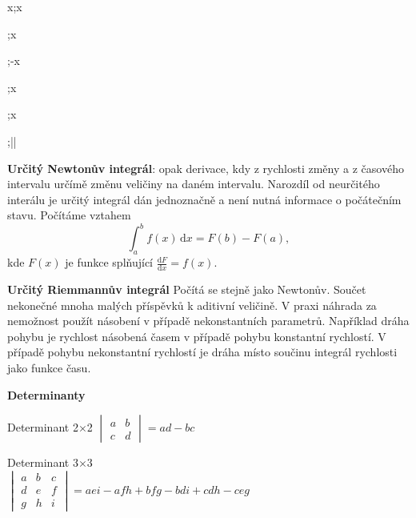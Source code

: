 \documentclass{article}
\def\tg{\mathop{\mathrm{tg}}}
\def\arctg{\mathop{\mathrm{arctg}}}
\def\cotg{\mathop{\mathrm{cotg}}}
\begin{document}
\begin{multicols}{3}
{{\begin{minipage}[t]{0.42\linewidth}
  \integral \cos x;\sin x

\end{minipage}\hfil\vrule\hfil
\begin{minipage}[t]{0.53\linewidth}
\parskip 3pt

  \integral {};\tg x

  \integral {};-\cotg x


  \integral {};\arcsin x

  \integral {};\arctg x

  \integral {};\ln\left|\right|

\end{minipage}}
}



\textbf{Určitý Newtonův integrál}: opak derivace, kdy z rychlosti změny a z časového intervalu určímě změnu veličiny na daném intervalu. Narozdíl od neurčitého interálu je určitý integrál dán jednoznačně a není nutná informace o počátečním stavu. Počítáme vztahem 
$$\int_a^bf(x)\,\mathrm dx=F(b)-F(a),$$
kde $F(x)$ je funkce splňující $\frac{\mathrm dF}{\mathrm dx}=f(x).$

\textbf{Určitý Riemmannův integrál} Počítá se stejně jako Newtonův. Součet nekonečné mnoha malých příspěvků k aditivní veličině. V praxi náhrada za nemožnost použít násobení v případě nekonstantních parametrů. Například dráha pohybu je rychlost násobená časem v případě pohybu konstantní rychlostí. V případě pohybu nekonstantní rychlostí je dráha místo součinu integrál rychlosti jako funkce času. 

\vfill
\null
{}

\columnbreak


\textbf{Determinanty}

\let\oldtextbf\textbf
\def\textbf{\smallskip\hrule\oldtextbf}
\vspace*{-10pt}

Determinant 2$\times$2 \hfill$
\begin{vmatrix}
  a & b \\ c &d
\end{vmatrix}
=ad-bc
$

Determinant 3$\times$3 \\\null\hfill$
\begin{vmatrix}
  a & b & c \\ d & e &f \\ g & h & i
\end{vmatrix}
=aei-afh+bfg-bdi+cdh-ceg
$\hfill\null


\end{multicols}
\end{document}
